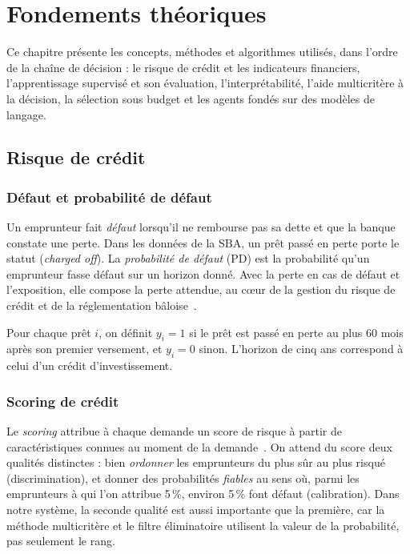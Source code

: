 \chapter{Fondements théoriques}\label{chap:theorie}

Ce chapitre présente les concepts, méthodes et algorithmes utilisés, dans l'ordre de la chaîne de décision :
le risque de crédit et les indicateurs financiers, l'apprentissage supervisé et son évaluation, l'interprétabilité,
l'aide multicritère à la décision, la sélection sous budget et les agents fondés sur des modèles de langage.

\section{Risque de crédit}

\subsection{Défaut et probabilité de défaut}

Un emprunteur fait \emph{défaut} lorsqu'il ne rembourse pas sa dette et que la banque constate une perte. Dans les
données de la SBA, un prêt passé en perte porte le statut  (\textit{charged off}). La \emph{probabilité de
défaut} (PD) est la probabilité qu'un emprunteur fasse défaut sur un horizon donné. Avec la perte en cas de défaut
et l'exposition, elle compose la perte attendue, au cœur de la gestion du risque de crédit et de la réglementation
bâloise~\cite{bcbs2006}.

\begin{definition}
Pour chaque prêt $i$, on définit $y_i = 1$ si le prêt est passé en perte au plus 60 mois après son premier
versement, et $y_i = 0$ sinon. L'horizon de cinq ans correspond à celui d'un crédit d'investissement.
\end{definition}

\subsection{Scoring de crédit}

Le \emph{scoring} attribue à chaque demande un score de risque à partir de caractéristiques connues au moment de la
demande~\cite{thomas2002}. On attend du score deux qualités distinctes : bien \emph{ordonner} les emprunteurs du plus
sûr au plus risqué (discrimination), et donner des probabilités \emph{fiables} au sens où, parmi les emprunteurs à
qui l'on attribue 5\,\%, environ 5\,\% font défaut (calibration). Dans notre système, la seconde qualité est aussi
importante que la première, car la méthode multicritère et le filtre éliminatoire utilisent la valeur de la
probabilité, pas seulement le rang.

